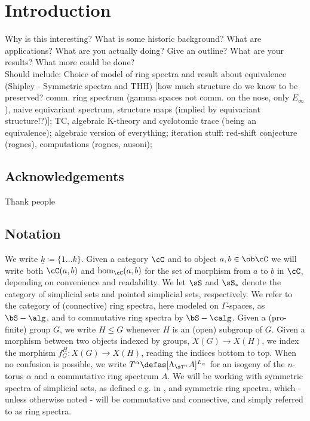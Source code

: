 \section{Introduction}
  Why is this interesting? What is some historic background? What are applications? What are you actually doing? Give an outline? What are your results? What more could be done?\\
  Should include: Choice of model of ring spectra and result about equivalence (Shipley - Symmetric spectra and THH) [how much structure do we know to be preserved? comm. ring spectrum (gamma spaces not comm. on the nose, only $E_\infty$), naive equivariant spectrum, structure maps (implied by equivariant structure!?)]; TC, algebraic K-theory and cyclotomic trace (being an equivalence); algebraic version of everything; iteration stuff: red-shift conjecture (rognes), computations (rognes, ausoni);
  \subsection{Acknowledgements}
    Thank people %
  \subsection{Notation}
    We write $\underline{k} \coloneqq \{1 \ldots k \}$.
    Given a category $\cC$ and to object $a,b \in \ob \cC$ we will write both
    $\cC(a,b)$ and $\hom_{\cC}(a,b)$ for the set of morphism from $a$ to $b$ in
    $\cC$, depending on convenience and readability.
    We let $\sS$ and $\sS_*$ denote the category of simplicial sets and pointed
    simplicial sets, respectively.
    We refer to the category of (connective) ring spectra, here modeled on
    $\Gamma$-spaces, as $\bS-\alg$, and to commutative ring spectra by
    $\bS-\calg$.
    Given a (pro-finite) group $G$, we write $H \leq G$ whenever $H$ is an
    (open) subgroup of $G$.
    Given a morphism between two objects indexed by groups, $X(G) \to X(H)$, we
    index the morphism $f_G^H: X(G) \to X(H)$, reading the indices bottom to
    top.
    When no confusion is possible, we write $T^\alpha \defas [\Lambda_{\sT^n}
    A]^{L_\alpha}$ for an isogeny of the $n$-torus $\alpha$ and a commutative
    ring spectrum $A$.
    We will be working with symmetric spectra of simplicial sets, as defined
    e.g. in \cite{schwede2012symmetric}, and symmetric ring spectra, which -
    unless otherwise noted - will be commutative and connective, and simply
    referred to as ring spectra.
    
